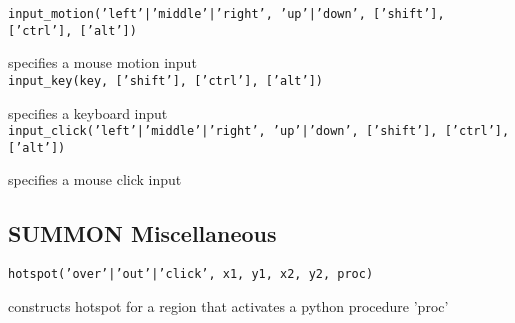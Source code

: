 {\tt input\_motion('left'|'middle'|'right', 'up'|'down', ['shift'], ['ctrl'], ['alt']) }

specifies a mouse motion input \\


{\tt input\_key(key, ['shift'], ['ctrl'], ['alt']) }

specifies a keyboard input \\


{\tt input\_click('left'|'middle'|'right', 'up'|'down', ['shift'], ['ctrl'], ['alt']) }

specifies a mouse click input \\


\subsection{ SUMMON Miscellaneous }

{\tt hotspot('over'|'out'|'click', x1, y1, x2, y2, proc) }

constructs hotspot for a region that activates a python procedure 'proc' \\


